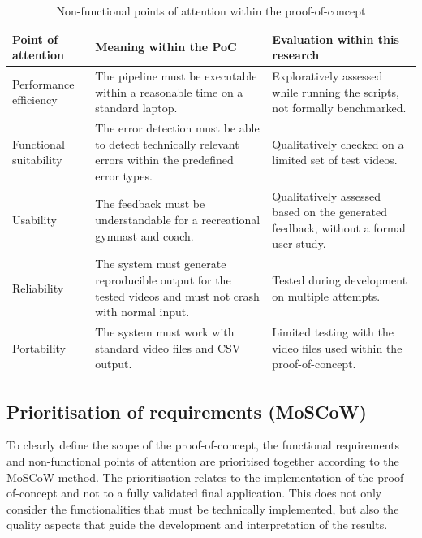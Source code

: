 \begin{table}[h]
    \centering
    \footnotesize
    \begin{tabularx}{\textwidth}{p{3cm}p{4cm}X}
        \toprule
        \textbf{Point of attention} & \textbf{Meaning within the PoC} & \textbf{Evaluation within this research} \\
        \midrule
        Performance efficiency & The pipeline must be executable within a reasonable time on a standard laptop. & Exploratively assessed while running the scripts, not formally benchmarked. \\
        Functional suitability & The error detection must be able to detect technically relevant errors within the predefined error types. & Qualitatively checked on a limited set of test videos. \\
        Usability & The feedback must be understandable for a recreational gymnast and coach. & Qualitatively assessed based on the generated feedback, without a formal user study. \\
        Reliability & The system must generate reproducible output for the tested videos and must not crash with normal input. & Tested during development on multiple attempts. \\
        Portability & The system must work with standard video files and CSV output. & Limited testing with the video files used within the proof-of-concept. \\
        \bottomrule
    \end{tabularx}
    \caption{Non-functional points of attention within the proof-of-concept}
    \label{tab:nfr_poc}
\end{table}

\subsection{Prioritisation of requirements (MoSCoW)}

To clearly define the scope of the proof-of-concept, the functional requirements and non-functional points of attention are prioritised together according to the MoSCoW method. The prioritisation relates to the implementation of the proof-of-concept and not to a fully validated final application. This does not only consider the functionalities that must be technically implemented, but also the quality aspects that guide the development and interpretation of the results.


